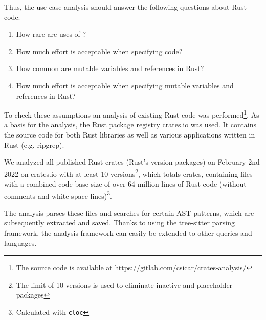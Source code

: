 \documentclass[twoside, english]{sdqthesis}
\theoremstyle{definition}
\begin{document}
Thus, the use-case analysis should answer the following questions about Rust code:
\begin{enumerate}
  \item How rare are uses of ?
  \item How much effort is acceptable when specifying  code?
  \item How common are mutable variables and references in Rust?
  \item How much effort is acceptable when specifying mutable variables and references in Rust?
\end{enumerate}

To check these assumptions an analysis of existing Rust code was performed\footnote{The source code is available at \url{https://gitlab.com/csicar/crates-analysis/}}. As a basis for the analysis, the Rust package registry \href{https://www.crates.io}{crates.io} was used. It contains the source code for both Rust libraries as well as various applications written in Rust (e.g. ripgrep). 

We analyzed all published Rust crates (Rust's version packages) on February 2nd 2022 on crates.io with at least 10 versions\footnote{The limit of 10 versions is used to eliminate inactive and placeholder packages}, which totals  crates, containing  files with a combined code-base size of over 64 million lines of Rust code (without comments and white space lines)\footnote{Calculated with \texttt{cloc}}. 


The analysis parses these files and searches for certain AST patterns, which are subsequently extracted and saved.
Thanks to using the tree-sitter parsing framework, the analysis framework can easily be extended to other queries and languages.
\end{document}
